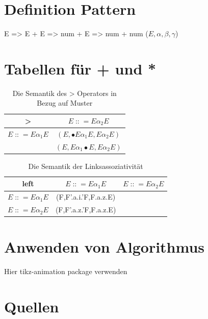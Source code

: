 \documentclass[t]{beamer}
\renewcommand{\Coloneqq}{\mathrel{\mathop{::}}=}
\begin{document}
    \section{Definition Pattern}
    \begin{frame}
        E => E + E => num + E => num + num
        ($E, \alpha, \beta, \gamma$)
    \end{frame}


    \section{Tabellen für + und *}
    \begin{frame}
        \begin{table}[h]
            \centering
            \caption{Die Semantik des > Operators in Bezug auf Muster}
            \begin{tabular}{|c|c|}
                \hline
                >                          & $E \Coloneqq E\alpha_{2}E$                   \\
                \hline
                $E \Coloneqq E\alpha_{1}E$ & $(E, \bullet{E}\alpha_{1}E, {E}\alpha_{2}E)$ \\
                                           & $(E, E\alpha_{1}\bullet{E}, E\alpha_{2}E)$ \\
                \hline
            \end{tabular}\label{tab:table}
        \end{table}

        \begin{table}[h]
            \centering
            \caption{Die Semantik der Linksassoziativität}
            \begin{tabular}{|c|c|c|}
                \hline
                left & $E \Coloneqq E\alpha_{1}E$ & $E \Coloneqq E\alpha_{2}E$ \\
                \hline
                $E \Coloneqq E\alpha_{1}E$ & (F,F'.a.i.'F,F.a.z.E) & \\
                \hline
                $E \Coloneqq E\alpha_{2}E$ & (F,F'.a.z.'F,F.a.z.E) & \\
                \hline
            \end{tabular}\label{tab:table2}
        \end{table}

    \end{frame}


    \section{Anwenden von Algorithmus}
    \begin{frame}
        Hier tikz-animation package verwenden
    \end{frame}


    \section{Quellen}
    \begin{frame}[allowframebreaks]
        
        
    \end{frame}
\end{document}
